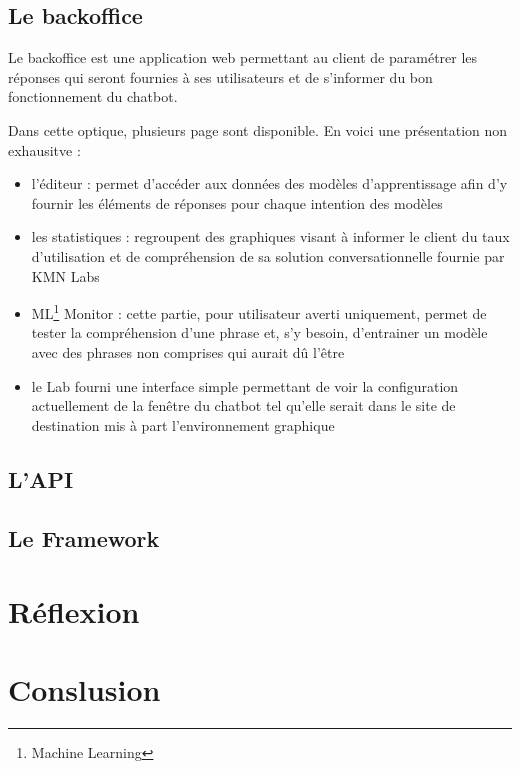 \documentclass[12pt,a4paper,twoside]{scrreprt}
\begin{document}
\section{Le backoffice}

Le backoffice est une application web permettant au client de paramétrer les réponses qui seront fournies à ses utilisateurs et de s'informer du bon fonctionnement du chatbot.

Dans cette optique, plusieurs page sont disponible. En voici une présentation non exhausitve :
\begin{itemize}
	\item l'éditeur : permet d'accéder aux données des modèles d'apprentissage afin d'y fournir les éléments de réponses pour chaque intention des modèles
	\item les statistiques : regroupent des graphiques visant à informer le client du taux d'utilisation et de compréhension de sa solution conversationnelle fournie par KMN Labs
	\item ML\footnote{Machine Learning} Monitor : cette partie, pour utilisateur averti uniquement, permet de tester la compréhension d'une phrase et, s'y besoin, d'entrainer un modèle avec des phrases non comprises qui aurait dû l'être
	\item le Lab fourni une interface simple permettant de voir la configuration actuellement de la fenêtre du chatbot tel qu'elle serait dans le site de destination mis à part l'environnement graphique
\end{itemize}

\section{L'API}

\section{Le Framework}

\chapter{Réflexion}

\chapter{Conslusion}
\end{document}

